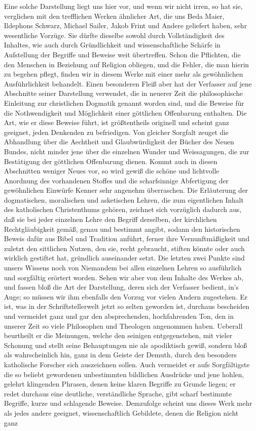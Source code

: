 Eine solche Darstellung liegt uns hier vor, und wenn wir nicht irren, so hat sie, verglichen mit den trefflichen Werken ähnlicher Art, die uns Beda Maier, Ildephons Schwarz, Michael Sailer, Jakob Frint und Andere geliefert haben, sehr wesentliche Vorzüge. Sie dürfte dieselbe sowohl durch Vollständigkeit des Inhaltes, wie auch durch Gründlichkeit und wissenschaftliche Schärfe in Aufstellung der Begriffe und Beweise weit übertreffen. Schon die Pflichten, die den Menschen in Beziehung auf Religion obliegen, und die Fehler, die man hierin zu begehen pflegt, finden wir in diesem Werke mit einer mehr als gewöhnlichen Ausführlichkeit behandelt. Einen besonderen Fleiß aber hat der Verfasser auf jene Abschnitte seiner Darstellung verwendet, die in neuerer Zeit die philosophische Einleitung zur christlichen Dogmatik genannt worden sind, und die Beweise für die Nothwendigkeit und Möglichkeit einer göttlichen Offenbarung enthalten. Die Art, wie er diese Beweise führt, ist größtentheils originell und scheint ganz geeignet, jeden Denkenden zu befriedigen. Von gleicher Sorgfalt zeuget die Abhandlung über die Aechtheit und Glaubwürdigkeit der Bücher des Neuen Bundes, nicht minder jene über die einzelnen Wunder und Weissagungen, die zur Bestätigung der göttlichen Offenbarung dienen. Kommt auch in diesen Abschnitten weniger Neues vor, so wird gewiß die schöne und lichtvolle Anordnung des vorhandenen Stoffes und die scharfsinnige Abfertigung der gewöhnlichen Einwürfe Kenner sehr angenehm überraschen. Die Erläuterung der dogmatischen, moralischen und asketischen Lehren, die zum eigentlichen Inhalt des katholischen Christenthums gehören, zeichnet sich vorzüglich dadurch aus, daß sie bei jeder einzelnen Lehre den Begriff derselben, der kirchlichen Rechtgläubigkeit gemäß, genau und bestimmt angibt, sodann den historischen Beweis dafür aus Bibel und Tradition anführt, ferner ihre Vernunftmäßigkeit und zuletzt den sittlichen Nutzen, den sie, recht gebraucht, stiften könnte oder auch wirklich gestiftet hat, gründlich auseinander setzt. Die letzten zwei Punkte sind unsers Wissens noch von Niemandem bei allen einzelnen Lehren so ausführlich und sorgfältig erörtert worden. Sehen wir aber von dem Inhalte des Werkes ab, und fassen bloß die Art der Darstellung, deren sich der Verfasser bedient, in's Auge; so müssen wir ihm ebenfalls den Vorzug vor vielen Andern zugestehen. Er ist, was in der Schriftstellerwelt jetzt so selten geworden ist, durchaus bescheiden und vermeidet ganz und gar den absprechenden, hochfahrenden Ton, den in unserer Zeit so viele Philosophen und Theologen angenommen haben. Ueberall beurtheilt er die Meinungen, welche den seinigen entgegenstehen, mit vieler Schonung und stellt seine Behauptungen nie als apodiktisch gewiß, sondern bloß als wahrscheinlich hin, ganz in dem Geiste der Demuth, durch den besonders katholische Forscher sich auszeichnen sollen. Auch vermeidet er aufs Sorgfältigste die so beliebt gewordenen unbestimmten bildlichen Ausdrücke und jene hohlen, gelehrt klingenden Phrasen, denen keine klaren Begriffe zu Grunde liegen; er redet durchaus eine deutliche, verständliche Sprache, gibt scharf bestimmte Begriffe, kurze und schlagende Beweise. Demzufolge scheint uns dieses Werk mehr als jedes andere geeignet, wissenschaftlich Gebildete, denen die Religion nicht ganz 